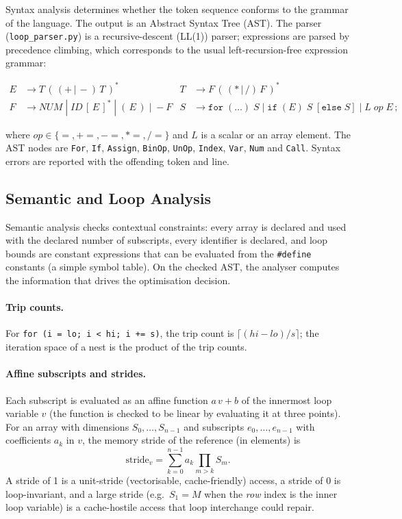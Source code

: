 \documentclass[12pt,a4paper]{article}
\begin{document}
Syntax analysis determines whether the token sequence conforms to the grammar
of the language. The output is an Abstract Syntax Tree (AST). The parser
(\texttt{loop\_parser.py}) is a recursive-descent (LL(1)) parser; expressions are
parsed by precedence climbing, which corresponds to the usual left-recursion-free
expression grammar:

\begin{align*}
E &\rightarrow T\,(\,(+\,|\,-)\,T\,)^{*} &
T &\rightarrow F\,(\,(*\,|\,/)\,F\,)^{*} \\
F &\rightarrow \mathit{NUM}\;|\;\mathit{ID}\,[\,E\,]^{*}\;|\;(\,E\,)\;|\;-F &
S &\rightarrow \texttt{for}\;(\dots)\;S\;|\;\texttt{if}\;(E)\;S\;[\texttt{else}\;S]\;|\;L\;\mathit{op}\;E\,;
\end{align*}

where $\mathit{op}\in\{=,+\!=,-\!=,*\!=,/\!=\}$ and $L$ is a scalar or an array element.
The AST nodes are \texttt{For}, \texttt{If}, \texttt{Assign}, \texttt{BinOp},
\texttt{UnOp}, \texttt{Index}, \texttt{Var}, \texttt{Num} and \texttt{Call}.
Syntax errors are reported with the offending token and line.

\subsection{Semantic and Loop Analysis}

Semantic analysis checks contextual constraints: every array is declared and used
with the declared number of subscripts, every identifier is declared, and loop
bounds are constant expressions that can be evaluated from the \texttt{\#define}
constants (a simple symbol table). On the checked AST, the analyser computes the
information that drives the optimisation decision.

\paragraph{Trip counts.} For \texttt{for (i = lo; i < hi; i += s)}, the trip count is
$\lceil (hi-lo)/s\rceil$; the iteration space of a nest is the product of the trip counts.

\paragraph{Affine subscripts and strides.} Each subscript is evaluated as an
affine function $a\,v+b$ of the innermost loop variable $v$ (the function is
checked to be linear by evaluating it at three points). For an array with
dimensions $S_0,\dots,S_{n-1}$ and subscripts $e_0,\dots,e_{n-1}$ with
coefficients $a_k$ in $v$, the memory stride of the reference (in elements) is
\begin{equation}
\mathrm{stride}_v = \sum_{k=0}^{n-1} a_k \prod_{m>k} S_m .
\end{equation}
A stride of 1 is a unit-stride (vectorisable, cache-friendly) access, a stride of 0 is
loop-invariant, and a large stride (e.g.\ $S_1=M$ when the \emph{row} index is the inner loop
variable) is a cache-hostile access that loop interchange could repair.
\end{document}
